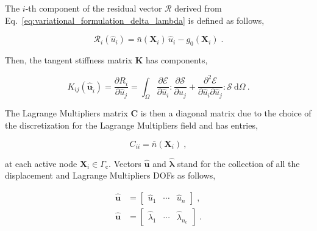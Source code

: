 \documentclass[10pt,a4paper]{article}
\begin{document}
The $i$-th component of the residual vector $\boldsymbol{\mathcal{R}}$ derived from Eq.~\eqref{eq:variational_formulation_delta_lambda} is defined as follows,

\begin{equation}
	\mathcal{R}_i ( \hat{u}_i ) = \bar{n} (\mathbf{X}_i) \, \hat{u}_i - g_0(\mathbf{X}_i) \;.
\end{equation}

Then, the tangent stiffness matrix $\mathbf{K}$ has components,

\begin{equation}
	K_{ij} ( \hat{\mathbf{u}}_{\hat{i}} ) = \frac{\partial R_i}{\partial \hat{u}_j} = \int_{\Omega} \frac{\partial \boldsymbol{\mathcal{E}}}{\partial \hat{u}_i} : \frac{\partial \boldsymbol{\mathcal{S}}}{\partial \hat{u}_j} + \frac{\partial^2 \boldsymbol{\mathcal{E}}}{\partial \hat{u}_i \partial \hat{u}_j} : \boldsymbol{\mathcal{S}} \: \text{d} \Omega \:. \label{eq:tangent_stiffness_matrix}
\end{equation}

The Lagrange Multipliers matrix $\mathbf{C}$ is then a diagonal matrix due to the choice of the discretization for the Lagrange Multipliers field and has entries,

\begin{equation}
	C_{ii} = \bar{n} (\mathbf{X}_i) \:,	\label{eq:lagrange_multipliers_matrix}
\end{equation}

at each active node $\mathbf{X}_i \in \Gamma_{\text{c}}$. Vectors $\hat{\mathbf{u}}$ and $\hat{\boldsymbol{\lambda}}$ stand for the collection of all the displacement and Lagrange Multipliers DOFs as follows,

\begin{subequations}
	\begin{alignat}{1}
		\hat{\mathbf{u}} &= \left[ \begin{array}{ccc} \hat{u}_1 & \cdots & \hat{u}_n \end{array} \right] \;, \label{eq:vector_of_displacement_dofs} \\
		\hat{\mathbf{u}} &= \left[ \begin{array}{ccc} \hat{\lambda}_1 & \cdots & \hat{\lambda}_{n_{\text{c}}} \end{array} \right] \;. \label{eq:vector_of_lagrange_multipliers_dofs}
	\end{alignat}
	\label{eq:vectors_of_dofs}
\end{subequations}
\end{document}
